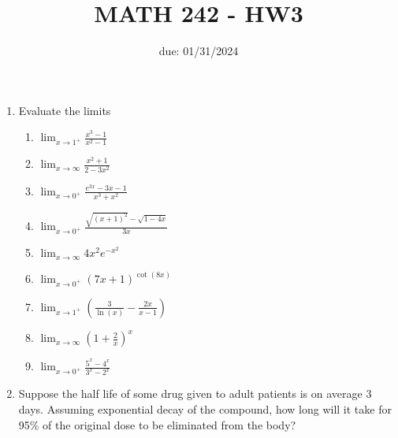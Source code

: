\documentclass[12pt]{article}
\title{MATH 242 - HW3}
\date{due: 01/31/2024}
\begin{document}
\maketitle


\begin{enumerate}

\item Evaluate the limits
\begin{enumerate}
    \item $\displaystyle\lim_{x\to 1^+}\frac{x^3-1}{x^2-1}$
    \vfill
    \item $\displaystyle\lim_{x\to\infty}\frac{x^2+1}{2-3x^2}$
    \vfill
    \item $\displaystyle\lim_{x\to 0^+}\frac{e^{3x}-3x-1}{x^3+x^2}$
    \vfill
    \newpage
    \item $\displaystyle\lim_{x\to0^+}\frac{\sqrt{(x+1)^2}-\sqrt{1-4x}}{3x}$
    \vfill
    \item $\displaystyle\lim_{x\to\infty}4x^2e^{-x^2}$
    \vfill
    \item $\displaystyle\lim_{x\to0^+}(7x+1)^{\cot(8x)}$
    \vfill
    \newpage
    \item $\displaystyle\lim_{x\to1^+}\left(\frac{3}{\ln{(x)}}-\frac{2x}{x-1}\right)$
    \vfill
    \item $\displaystyle\lim_{x\to\infty}\left(1+\frac{2}{x}\right)^x$
    \vfill
    \item $\displaystyle\lim_{x\to0^+}\frac{5^x-4^x}{3^x-2^x}$
    \vfill
\end{enumerate}
\newpage
\item Suppose the half life of some drug given to adult patients is on average 3 days. Assuming exponential decay of the compound, how long will it take for 95\% of the original dose to be eliminated from the body?
\end{enumerate}
\end{document}
